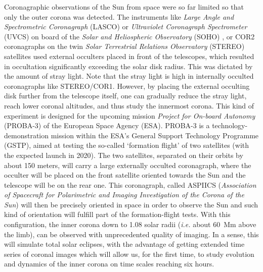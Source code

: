 \documentclass[namedreferences]{solarphysics}
\begin{document}
\begin{article}
Coronagraphic observations of the Sun from space were so far limited so that only the outer
corona was detected. The instruments like  {\it Large Angle and Spectrometric Coronagraph} (LASCO) or {\it Ultraviolet Coronagraph Spectrometer} (UVCS) 
on board of the {\it Solar and Heliospheric Observatory} (SOHO) \cite{Bru95,Koh95}, or COR2 coronagraphs on the twin {\it Solar Terrestrial Relations 
Observatory} (STEREO) satellites \cite{How08} used external occulters placed in front of the telescopes, which resulted in occultation significantly
exceeding the solar disk radius. This was dictated by the amount of stray light. Note that the stray light is high in internally occulted coronagraphs 
like STEREO/COR1. However, by placing the external occulting disk further from the telescope itself, one can gradually reduce the stray light,
reach lower coronal altitudes, and thus study the innermost corona. This kind of experiment is designed
for the upcoming mission {\it Project for On-board Autonomy} (PROBA-3) of the European Space Agency (ESA). PROBA-3 is a technology-demonstration
mission within the ESA’s General Support Technology Programme (GSTP), aimed at testing the so-called ‘formation flight’ of two
satellites (with the expected launch in 2020). The two satellites, separated on their orbits by about 150 meters, will carry a large
externally occulted coronagraph, where the occulter will be placed on the front satellite oriented towards
the Sun and the telescope will be on the rear one. This coronagraph, called ASPIICS ({\it Association of Spacecraft for Polarimetric and Imaging 
Investigation of the Corona of the Sun}) \cite{Lam10,Ren16} will then be precisely oriented in space in order to observe the Sun and such kind of 
orientation will fulfill part of the formation-flight tests. With this configuration, the inner corona down to 1.08 solar radii 
({\it i.e.} about 60~Mm above the limb), can be observed with unprecedented quality of imaging. In a sense, this will simulate total solar eclipses,
with the advantage of getting extended time series of coronal images which will allow us, for the first
time, to study evolution and dynamics of the inner corona on time scales reaching six hours.


\end{article}
\end{document}

